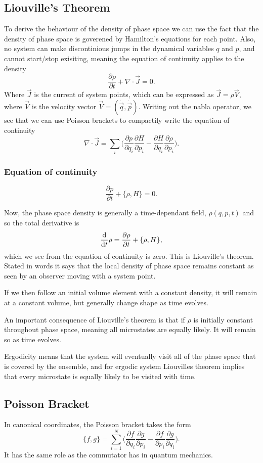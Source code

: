 \documentclass[a4paper, 11pt, notitlepage, english]{article}
\renewcommand{\d}{{\rm d}}
\renewcommand{\b}{\bigg}
\newcommand{\p}{\partial}
\begin{document}
\subsection*{Liouville's Theorem}
To derive the behaviour of the density of phase space we can use the fact that the density of phase space is goverened by Hamilton's equations for each point. Also, no system can make discontinious jumps in the dynamical variables $q$ and $p$, and cannot start/stop exisiting, meaning the equation of continuity applies to the density
$$\frac{\p \rho}{\p t} + \nabla \cdot \vec{J} = 0.$$
Where $\vec{J}$ is the current of system points, which can be expressed as $\vec{J} = \rho\vec{V}$, where $\vec{V}$ is the velocity vector $\vec{V} = (\dot{\vec{q}}, \dot{\vec{p}})$. Writing out the nabla operator, we see that we can use Poisson brackets to compactily write the equation of continuity
$$\nabla \cdot \vec{J} = \sum_i \b( \frac{\p p}{\p q_i}\frac{\p H}{\p p_i} - \frac{\p H}{\p q_i}\frac{\p \rho}{\p p_i}\b).$$
\subsubsection*{Equation of continuity}
$$\frac{\p p}{\p t} + \{\rho, H\} = 0.$$

Now, the phase space density is generally a time-dependant field, $\rho(q,p,t)$ and so the total derivative is
$$\frac{\d }{\d t} \rho = \frac{\p \rho}{\p t} + \{\rho, H\},$$
which we see from the equation of continuity is zero. This is Liouville's theorem. Stated in words it says that the local density of phase space remains constant as seen by an observer moving with a system point.

If we then follow an initial volume element with a constant density, it will remain at a constant volume, but generally change shape as time evolves. 

An important consequence of Liouville's theorem is that if $\rho$ is initially constant throughout phase space, meaning all microstates are equally likely. It will remain so as time evolves.

Ergodicity means that the system will eventually visit all of the phase space that is covered by the ensemble, and for ergodic system Liouvilles theorem implies that every microstate is equally likely to be visited with time.



\subsection*{Poisson Bracket}
In canonical coordinates, the Poisson bracket takes the form
$$\{f,g\} = \sum_{i=1}^N \b(\frac{\p f}{\p q_i}\frac{\p g}{\p p_i} - \frac{\p f}{\p p_i}\frac{\p g}{\p q_i}\b).$$
It has the same role as the commutator has in quantum mechanics.
\end{document}
